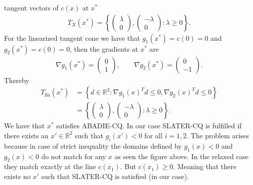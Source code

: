 tangent vectors of $c(x)$ at $x^{*}$
\begin{align}
    T_X(x^{*}) = \left\{\begin{pmatrix} \lambda\\ 0 \end{pmatrix}, \begin{pmatrix}
-\lambda\\ 0\end{pmatrix}   : \lambda \ge 0 \right\}.
\end{align}
For the linearized tangent cone we have that $g_1(x^{*}) = c(0) = 0 $ and
$g_2(x^{*})= c(0) = 0$, then the gradients at $x^{*}$ are
\begin{align}
    \nabla g_1(x^{*}) = \begin{pmatrix} 0\\1 \end{pmatrix}, \qquad
    \nabla g_2(x^{*}) = \begin{pmatrix} 0\\-1 \end{pmatrix}.
\end{align}
Thereby
\begin{align}
    T_\text{lin}(x^{*})
    &= \left\{ d \in \mathbb{R}^{2}: \nabla g_1(x)^{T}d \le 0, \nabla
    g_2(x)^{T}d\le 0 \right\} \\
    &= \left\{ \begin{pmatrix} \lambda\\0 \end{pmatrix}, \begin{pmatrix}
-\lambda \\ 0 \end{pmatrix} : \lambda \ge 0  \right\}.
\end{align}
We have that $x^{*}$ satisfies ABADIE-CQ.
\newline
In our case SLATER-CQ is fulfilled if there exists an $x' \in \mathbb{R}^{2}$
such that $g_i(x') < 0$ for all $i = 1,2$. The problem arises because in case
of strict inequality the domains defined by $g_1(x) < 0$ and $g_2(x) < 0$ do
not match for any $x$ as seen the figure above. In the relaxed case they
match exactly at the line $c(x_1)$. But $c(x_1) \ge 0$. Meaning that there
exists no $x'$ such that SLATER-CQ is satisfied (in our case).

